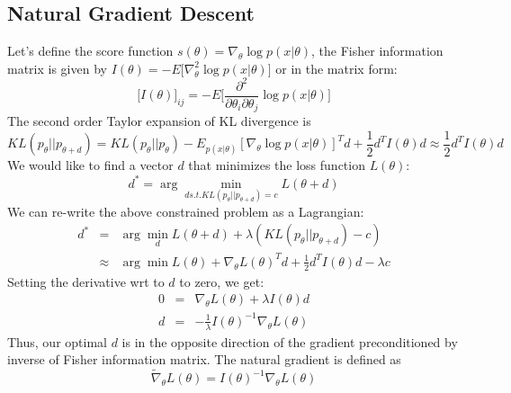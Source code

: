\subsection{Natural Gradient Descent}

Let's define the score function $s(\theta) = \nabla_{\theta}\log p(x|\theta)$, the Fisher information matrix is given by $I(\theta) = -E\bigg[\nabla_{\theta}^{2}\log p(x|\theta) \bigg]$ or in the matrix form:
\begin{equation}
    \bigg[I(\theta)\bigg]_{ij} = -E \bigg[\frac{\partial^2}{\partial \theta_i \partial \theta_j}\log p(x|\theta) \bigg]
\end{equation}
The second order Taylor expansion of KL divergence is
\begin{equation}
    KL(p_{\theta}||p_{\theta+d}) = KL(p_{\theta}||p_{\theta}) - E_{p(x|\theta)}[\nabla_{\theta}\log p(x|\theta)]^{T}d + \frac{1}{2}d^{T}I(\theta)d \approx \frac{1}{2}d^{T}I(\theta)d 
\end{equation}
We would like to find a vector $d$ that minimizes the loss function $L(\theta)$:
\begin{equation}
    d^{\ast} = \arg \min_{d s.t. KL(p_{\theta}||p_{\theta+d}) = c} L(\theta + d)
\end{equation}
We can re-write the above constrained problem as a Lagrangian:
\begin{eqnarray}
    d^{\ast} &=& \arg \min_d L(\theta + d) + \lambda (KL(p_{\theta}||p_{\theta + d})-c) \\
    &\approx& \arg \min L(\theta) + \nabla_{\theta}L(\theta)^{T}d + \frac{1}{2}d^{T}I(\theta)d - \lambda c
\end{eqnarray}
Setting the derivative wrt to $d$ to zero, we get:
\begin{eqnarray}
    0 &=& \nabla_{\theta}L(\theta) + \lambda I(\theta) d \\
    d &=& -\frac{1}{\lambda}I(\theta)^{-1}\nabla_{\theta}L(\theta)
\end{eqnarray}
Thus, our optimal $d$ is in the opposite direction of the gradient preconditioned by inverse of Fisher information matrix. The natural gradient is defined as
\begin{equation}
    \tilde{\nabla}_\theta L (\theta) = I(\theta)^{-1}\nabla_{\theta}L(\theta)
\end{equation}

